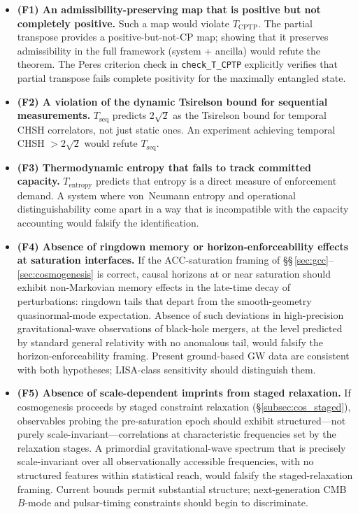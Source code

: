 \documentclass[11pt]{article}
\newenvironment{varlist}{\begin{itemize}[nosep,leftmargin=2em]}{\end{itemize}}
\begin{document}
\begin{varlist}
  \item \textbf{(F1) An admissibility-preserving map that is positive but
    not completely positive.}  Such a map would violate $T_{\mathrm{CPTP}}$.
    The partial transpose provides a positive-but-not-CP map; showing that it
    preserves admissibility in the full framework (system + ancilla) would
    refute the theorem.  The Peres criterion check in \texttt{check\_T\_CPTP}
    explicitly verifies that partial transpose fails complete positivity for
    the maximally entangled state.

  \item \textbf{(F2) A violation of the dynamic Tsirelson bound for
    sequential measurements.}  $T_{\mathrm{seq}}$ predicts $2\sqrt{2}$ as
    the Tsirelson bound for temporal CHSH correlators, not just static ones.
    An experiment achieving temporal CHSH $> 2\sqrt{2}$ would refute
    $T_{\mathrm{seq}}$.

  \item \textbf{(F3) Thermodynamic entropy that fails to track committed
    capacity.}  $T_{\mathrm{entropy}}$ predicts that entropy is a direct
    measure of enforcement demand.  A system where von~Neumann entropy and
    operational distinguishability come apart in a way that is incompatible
    with the capacity accounting would falsify the identification.

  \item \textbf{(F4) Absence of ringdown memory or horizon-enforceability
    effects at saturation interfaces.}  If the ACC-saturation framing of
    \S\S\,\ref{sec:gcc}--\ref{sec:cosmogenesis} is correct, causal
    horizons at or near saturation should exhibit non-Markovian memory
    effects in the late-time decay of perturbations: ringdown tails that
    depart from the smooth-geometry quasinormal-mode expectation.
    Absence of such deviations in high-precision gravitational-wave
    observations of black-hole mergers, at the level predicted by
    standard general relativity with no anomalous tail, would falsify the
    horizon-enforceability framing.  Present ground-based GW data are
    consistent with both hypotheses; LISA-class sensitivity should
    distinguish them.

  \item \textbf{(F5) Absence of scale-dependent imprints from staged
    relaxation.}  If cosmogenesis proceeds by staged constraint
    relaxation (\S\ref{subsec:cos_staged}), observables probing the
    pre-saturation epoch should exhibit structured---not purely
    scale-invariant---correlations at characteristic frequencies set by
    the relaxation stages.  A primordial gravitational-wave spectrum
    that is precisely scale-invariant over all observationally accessible
    frequencies, with no structured features within statistical reach,
    would falsify the staged-relaxation framing.  Current bounds permit
    substantial structure; next-generation CMB $B$-mode and pulsar-timing
    constraints should begin to discriminate.


\end{varlist}
\end{document}
